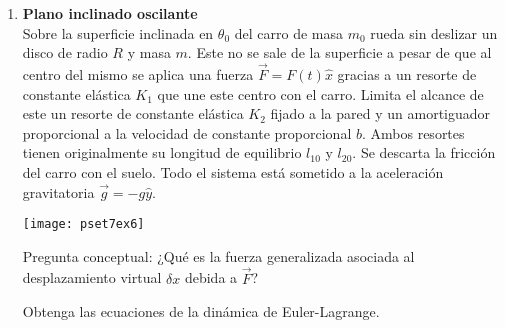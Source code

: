 \documentclass[11pt, spanish, a4paper, twoside]{article}
\begin{document}
\begin{enumerate}
\item
\begin{minipage}[t][6cm]{0.5\textwidth}
\textbf{Plano inclinado oscilante}\\
Sobre la superficie inclinada en $\theta_0$ del carro de masa $m_0$ rueda sin deslizar un disco de radio $R$ y masa $m$.
Este no se sale de la superficie a pesar de que al centro del mismo se aplica una fuerza $\vec{F}= F(t) \hat{x}$ gracias a un resorte de constante elástica $K_1$ que une este centro con el carro.
Limita el alcance de este un resorte de constante elástica $K_2$ fijado a la pared y un amortiguador proporcional a la velocidad de constante proporcional $b$.
Ambos resortes tienen originalmente su longitud de equilibrio $l_{10}$ y $l_{20}$.
Se descarta la fricción del carro con el suelo.
Todo el sistema está sometido a la aceleración gravitatoria $\vec{g}= - g \hat{y}$.\\
\end{minipage}
\begin{minipage}[c][0cm][t]{0.45\textwidth}
	\texttt{[image: pset7ex6]}
\end{minipage}
Pregunta conceptual: ¿Qué es la fuerza generalizada asociada al desplazamiento virtual $\delta x$ debida a $\vec{F}$?


Obtenga las ecuaciones de la dinámica de Euler-Lagrange. 



\end{enumerate}
\end{document}
